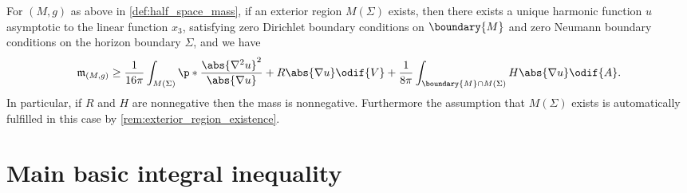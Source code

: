 \documentclass[titlepage,numbers=noenddot,oneside,%
cleardoublepage=empty,paper=a4,fontsize=11pt,%
english,%
]{scrartcl}
\newcommand{\mass}[2]{\mathfrak{m}_{(#1,#2)}} %
\begin{document}
\begin{theorem}\label{thm:main_result}
    For \( (M,g) \) as above in \cref{def:half_space_mass}, if an exterior region \( M(\Sigma) \) exists, then
    there exists a unique harmonic function \( u \) asymptotic to the linear function \( x_3 \), satisfying zero Dirichlet boundary conditions on \( \boundary{M} \) and zero Neumann boundary conditions on the horizon boundary \( \Sigma \), and we have
    \begin{equation}
        \mass{M}{g}\geq \frac{1}{16\pi}\int_{M(\Sigma)}\p*{\frac{\abs{\nabla^2 u}^2}{\abs{\nabla u}}+R\abs{\nabla u}}\odif{V}+\frac{1}{8\pi}\int_{\boundary{M}\cap M(\Sigma)}H \abs{\nabla u}\odif{A}.\label{eq:main_result}
    \end{equation} 
    In particular, if \( R \) and \( H \) are nonnegative then the mass is nonnegative. Furthermore the assumption that \( M(\Sigma) \) exists is automatically fulfilled in this case by \cref{rem:exterior_region_existence}.
\end{theorem} 



\section{Main basic integral inequality}
\end{document}
